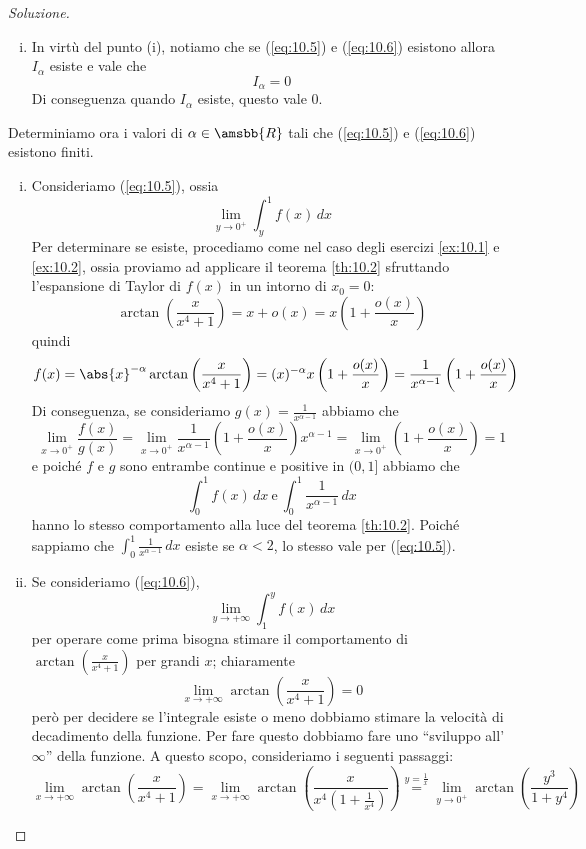 \begin{proof}[Soluzione]
\begin{enumerate}[(i)]
        \item In virtù del punto (i), notiamo che se (\ref{eq:10.5}) e (\ref{eq:10.6}) esistono allora $I_\alpha$ esiste e vale che
        \[
        I_\alpha = 0
        \]
        Di conseguenza quando $I_\alpha$ esiste, questo vale 0.
    \end{enumerate}
    Determiniamo ora i valori di $\alpha\in\amsbb{R}$ tali che (\ref{eq:10.5}) e (\ref{eq:10.6}) esistono finiti.
    \begin{enumerate}[(i)]
        \item Consideriamo (\ref{eq:10.5}), ossia
        \[
        \lim_{y\to 0^+} \int_y^1 f(x)\, dx 
        \]
        Per determinare se esiste, procediamo come nel caso degli esercizi \ref{ex:10.1} e \ref{ex:10.2}, ossia proviamo ad applicare il teorema \ref{th:10.2} sfruttando l'espansione di Taylor di $f(x)$ in un intorno di $x_0=0$:
        \[
        \arctan\left(\frac{x}{x^4+1}\right) = x+o(x) = x\left(1+\frac{o(x)}{x}\right)
        \]
        quindi
        \[
        f(x) = \abs{x}^{-\alpha} \arctan\left(\frac{x}{x^4+1}\right) = ({x})^{-\alpha} x \left(1+\frac{o(x)}{x}\right) = \frac{1}{x^{\alpha-1}} \left(1+\frac{o(x)}{x}\right) 
        \]
        Di conseguenza, se consideriamo $g(x) = \frac{1}{x^{\alpha-1}}$ abbiamo che
        \[
        \lim_{x\to 0^+} \frac{f(x)}{g(x)} = \lim_{x\to 0^+}\frac{1}{x^{\alpha-1}}\left(1+\frac{o(x)}{x}\right)x^{\alpha-1} = \lim_{x\to 0^+} \left(1+\frac{o(x)}{x}\right) = 1
        \]
        e poiché $f$ e $g$ sono entrambe continue e positive in $(0,1]$ abbiamo che
        \[
        \int_0^1 f(x)\, dx \ \text{e} \ \int_0^1 \frac{1}{x^{\alpha-1}}\, dx
        \]
        hanno lo stesso comportamento alla luce del teorema \ref{th:10.2}. Poiché sappiamo che $\int_0^1 \frac{1}{x^{\alpha-1}}\, dx$ esiste se $\alpha<2$, lo stesso vale per (\ref{eq:10.5}).
        \item Se consideriamo (\ref{eq:10.6}), 
        \[
        \lim_{y\to +\infty} \int_1^y f(x)\, dx 
        \]
        per operare come prima bisogna stimare il comportamento di $\arctan\left(\frac{x}{x^4+1}\right)$ per grandi $x$; chiaramente 
        \[
        \lim_{x\to+\infty} \arctan\left(\frac{x}{x^4+1}\right)=0
        \]
        però per decidere se l'integrale esiste o meno dobbiamo stimare la velocità di decadimento della funzione. Per fare questo dobbiamo fare uno ``sviluppo all'$\infty$'' della funzione. A questo scopo, consideriamo i seguenti passaggi:
        \[
        \lim_{x\to +\infty} \arctan\left(\frac{x}{x^4+1}\right) = \lim_{x\to +\infty} \arctan\left(\frac{x}{x^4\left(1+\frac{1}{x^4}\right)}\right ) \overset{y=\frac{1}{x}}{=} \lim_{y\to 0^+} \arctan\left(\frac{y^3}{1+y^4}\right)
\]
\end{enumerate}
\end{proof}
